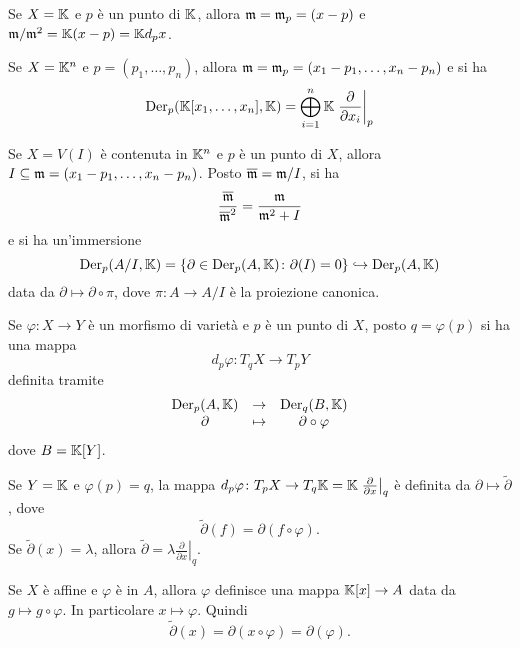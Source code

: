 \begin{example}
    Se $X=\mathbb{K}$ e $p$ è un punto di $\mathbb{K}$, allora $\mathfrak{m}=\mathfrak{m}_p=(x-p)$ e $\mathfrak{m}/\mathfrak{m}^2=\mathbb{K}(x-p)=\mathbb{K} d_p x$.
\end{example}

\begin{example}
    Se $X=\mathbb{K}^n$ e $p=(p_1,\ldots,p_n)$, allora $\mathfrak{m}=\mathfrak{m}_p=(x_1-p_1,\ldots,x_n-p_n)$ e si ha \[\operatorname{Der}_p(\mathbb{K}[x_1,\ldots,x_n],\mathbb{K})=\bigoplus_{i=1}^n \mathbb{K} \left.\frac{\partial}{\partial x_i}\right\lvert_{p}\]
\end{example}

\begin{example}
    Se $X=V(I)$ è contenuta in $\mathbb{K}^n$ e $p$ è un punto di $X$, allora $I\subseteq \mathfrak{m}=(x_1-p_1,\ldots,x_n-p_n)$. Posto $\overline{\mathfrak{m}}=\mathfrak{m}/I$, si ha \[\frac{\overline{\mathfrak{m}}}{\overline{\mathfrak{m}}^2}=\frac{\mathfrak{m}}{\mathfrak{m}^2+I} \] e si ha un'immersione 
    \[\operatorname{Der}_p(A/I,\mathbb{K})=\left\{\partial\in \operatorname{Der}_p(A,\mathbb{K}) \colon \partial(I)=0\right\}\hookrightarrow \operatorname{Der}_p(A,\mathbb{K}) \]
    data da $\partial\mapsto \partial\circ \pi$, dove $\pi\colon A \to A/I$ è la proiezione canonica.
\end{example}

\begin{remark}
    Se $\varphi\colon X \to Y$ è un morfismo di varietà e $p$ è un punto di $X$, posto $q=\varphi(p)$ si ha una mappa \[d_p\varphi \colon  T_qX \to  T_p Y\] definita tramite
    \[\begin{array}{ccc}
         \operatorname{Der}_p(A,\mathbb{K}) &\to & \operatorname{Der}_q(B,\mathbb{K})  \\
        \partial &\mapsto & \partial\circ \varphi
    \end{array}\]
    dove $B=\mathbb{K}[Y]$. 
\end{remark}

\begin{example}
Se $Y=\mathbb{K}$ e $\varphi(p)=q$, la mappa $d_p\varphi\colon T_p X \to T_q \mathbb{K}=\mathbb{K} \left.\frac{\partial}{\partial x}\right\lvert_q$ è definita da $\partial \mapsto \widetilde{\partial}$, dove 
\[\widetilde{\partial}(f)=\partial(f\circ \varphi).\] 
Se $\widetilde{\partial}(x)=\lambda$, allora $\widetilde{\partial}=\lambda\left.\frac{\partial}{\partial x}\right\lvert_q $.
\end{example}

\begin{remark}
Se $X$ è affine e $\varphi$ è in $A$, allora $\varphi$ definisce una mappa $\mathbb{K}[x]\to A$ data da $g\mapsto g\circ \varphi$. In particolare $x\mapsto \varphi$. Quindi \[\widetilde{\partial}(x)=\partial(x\circ \varphi)=\partial(\varphi).\]
\end{remark}


